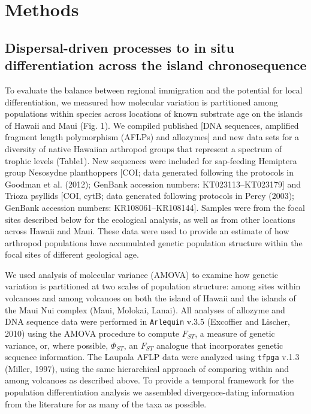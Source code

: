 \section{Methods}

\subsection{Dispersal-driven processes to in situ differentiation
across the island chronosequence}

To evaluate the balance between regional immigration and the potential
for local differentiation, we measured how molecular variation is
partitioned among populations within species across locations of known
substrate age on the islands of Hawaii and Maui (Fig. 1). We compiled
published [DNA sequences, amplified fragment length polymorphism
(AFLPs) and allozymes] and new data sets for a diversity of native
Hawaiian arthropod groups that represent a spectrum of trophic levels
(Table1). New sequences were included for sap-feeding Hemiptera group
Nesosydne planthoppers [COI; data generated following the protocols in
Goodman et al. (2012); GenBank accession numbers: KT023113–KT023179]
and Trioza psyllids [COI, cytB; data generated following protocols in
Percy (2003); GenBank accession numbers: KR108061–KR108144]. Samples
were from the focal sites described below for the ecological analysis,
as well as from other locations across Hawaii and Maui. These data
were used to provide an estimate of how arthropod populations have
accumulated genetic population structure within the focal sites of
different geological age.

We used analysis of molecular variance (AMOVA) to examine how genetic
variation is partitioned at two scales of population structure: among
sites within volcanoes and among volcanoes on both the island of
Hawaii and the islands of the Maui Nui complex (Maui, Molokai,
Lanai). All analyses of allozyme and DNA sequence data were performed
in \texttt{Arlequin} v.3.5 (Excoffier and Lischer, 2010) using the AMOVA
procedure to compute $F_{ST}$, a measure of genetic variance, or,
where possible, $\Phi_{ST}$, an $F_{ST}$ analogue that incorporates
genetic sequence information. The Laupala AFLP data were analyzed
using \texttt{tfpga} v.1.3 (Miller, 1997), using the same hierarchical
approach of comparing within and among volcanoes as described
above. To provide a temporal framework for the population
differentiation analysis we assembled divergence-dating information
from the literature for as many of the taxa as possible.

